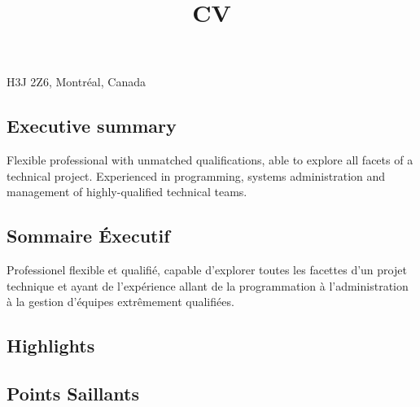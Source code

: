 \title{CV}
\address{151 Atwater, CP 72107}{H3J 2Z6, Montr\'{e}al, Canada}



\makecvtitle

\begin{langen}
\section{Executive summary}
Flexible professional with unmatched qualifications, able to explore all facets of a technical project. Experienced in programming, systems administration and management of highly-qualified technical teams.
\end{langen}

\begin{langfr}
\section{Sommaire \'{E}xecutif}
Professionel flexible et qualifi\'{e}, capable d'explorer toutes les facettes d'un projet technique et ayant de l'exp\'{e}rience allant de la programmation \`{a} l'administration \`{a} la gestion d'\'{e}quipes extr\^{e}mement qualifi\'{e}es.
\end{langfr}

\begin{langen}
\subsection{Highlights}
\end{langen}
\begin{langfr}
\subsection{Points Saillants}
\end{langfr}

